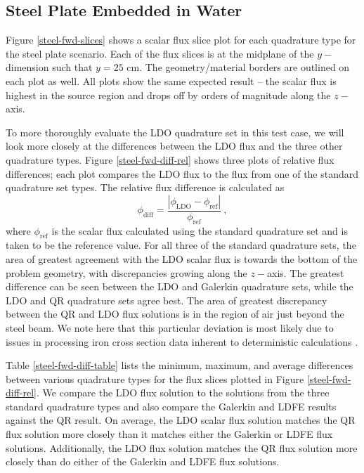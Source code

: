 \documentclass{article} %
\begin{document}
\subsection{Steel Plate Embedded in Water}

Figure \ref{steel-fwd-slices} shows a scalar flux slice plot for each
quadrature type for the steel plate scenario.  Each of the flux slices is at
the midplane of the $y-$dimension such that $y = 25$ cm. The geometry/material
borders are outlined on each plot as well. All plots show the same expected
result -- the scalar flux is highest in the source region and drops off by
orders of magnitude along the $z-$axis.

To more thoroughly evaluate the LDO quadrature set in this test case, we will
look more closely at the differences between the LDO flux and
the three other quadrature types. Figure \ref{steel-fwd-diff-rel} shows three
plots of relative flux differences; each plot compares the LDO
flux to the flux from one of the standard quadrature set types. The relative
flux difference is calculated as
%
\begin{equation}
\phi_{\mathrm{diff}} = 
\frac{\left|\phi_{\mathrm{LDO}}-\phi_{\mathrm{ref}}\right|}{\phi_{\mathrm{ref}}}\:,
\label{flux-diff}
\end{equation}
%
where $\phi_{\mathrm{ref}}$ is the scalar flux calculated using the 
standard quadrature set and is taken to be the reference value. For all three
of the standard quadrature sets, the area of greatest agreement with the LDO
scalar flux is towards the bottom of the problem geometry, with discrepancies
growing along the $z-$axis. The greatest difference can be seen between the LDO
and Galerkin quadrature sets, while the LDO and QR quadrature sets agree best.
The area of greatest discrepancy between the QR and LDO flux solutions is in
the region of air just beyond the steel beam. We note here that this particular
deviation is most likely due to issues in processing iron cross section data
inherent to deterministic calculations \cite{wilsonslaybaugh}.

Table \ref{steel-fwd-diff-table} lists the minimum, maximum, and average
differences between various quadrature types for the flux slices plotted in
Figure \ref{steel-fwd-diff-rel}. We compare the LDO flux
solution to the solutions from the three standard quadrature
types and also compare the Galerkin and LDFE results against the QR result. On
average, the LDO scalar flux solution matches the QR flux solution more
closely than it matches either the Galerkin or LDFE flux solutions.
Additionally, the LDO flux solution matches the QR flux solution more closely
than do either of the Galerkin and LDFE flux solutions.
\end{document}
